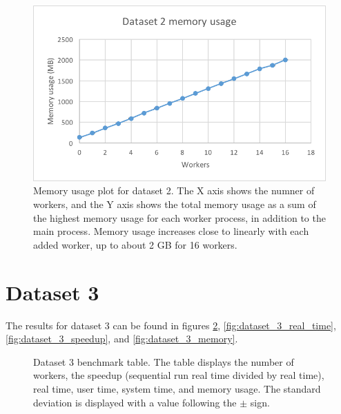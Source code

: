 \begin{figure}[ht]
  \centering
  \includegraphics[width=120mm]{figures/dataset_2/dataset_2_memory.png}
  \caption[Memory usage plot for dataset 2.]{Memory usage plot for dataset 2. The X axis shows the numner of workers, and the Y axis shows the total memory usage as
  a sum of the highest memory usage for each worker process, in addition to the main process. Memory usage increases close to linearly with each added worker,
  up to about 2 GB for 16 workers.}
  \label{fig:dataset_2_memory}
\end{figure}

\section{Dataset 3}
The results for dataset 3 can be found in figures \ref{fig:dataset_3_table}, \ref{fig:dataset_3_real_time}, \ref{fig:dataset_3_speedup}, and \ref{fig:dataset_3_memory}.

\begin{figure}[ht]
\centering
{}
\caption[Dataset 3 benchmark table.]{Dataset 3 benchmark table. The table displays the number of workers, the speedup (sequential run real time divided by real time), real time,
user time, system time, and memory usage. The standard deviation is displayed with a value following the $\pm$ sign.}
\label{fig:dataset_3_table}
\end{figure}

